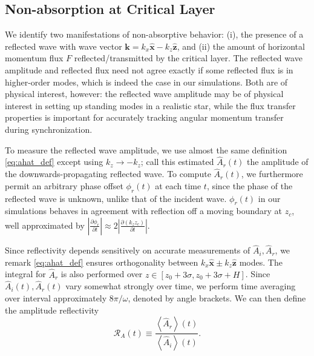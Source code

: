 \documentclass[
        fleqn,
        usenatbib,
    ]{mnras}
\newcommand*{\pd}[2]{\frac{\partial#1}{\partial#2}}
\newcommand*{\abs}[1]{\left|#1\right|}
\newcommand*{\ev}[1]{\left\langle#1\right\rangle}
\newcommand*{\bm}[1]{\boldsymbol{\mathbf{#1}}}
\newcommand*{\uv}[1]{\hat{\boldsymbol{\mathbf{#1}}}}
\begin{document}
\subsection{Non-absorption at Critical Layer}\label{ss:reflectivity}

We identify two manifestations of non-absorptive behavior: (i), the presence of
a reflected wave with wave vector $\bm{k} = k_{x}\uv{x} - k_{z}\uv{z}$, and (ii)
the amount of horizontal momentum flux $F$ reflected/transmitted by the critical
layer. The reflected wave amplitude and reflected flux need not agree exactly if
some reflected flux is in higher-order modes, which is indeed the case in our
simulations. Both are of physical interest, however: the reflected wave
amplitude may be of physical interest in setting up standing modes in a
realistic star, while the flux transfer properties is important for accurately
tracking angular momentum transfer during synchronization.

To measure the reflected wave amplitude, we use almost the same definition
\autoref{eq:ahat_def} except using $k_{z} \to -k_{z}$; call this estimated
$\hat{A}_r(t)$ the amplitude of the downwards-propagating reflected wave. To
compute $\hat{A}_r(t)$, we furthermore permit an arbitrary phase offset
$\phi_r(t)$ at each time $t$, since the phase of the reflected wave is unknown,
unlike that of the incident wave. $\phi_r(t)$ in our simulations
behaves in agreement with reflection off a moving boundary at $z_c$,
well approximated by $\abs{\pd{\phi_r}{t}} \approx 2\abs{\pd{(k_{z}z_c)}{t}}$.

Since reflectivity depends sensitively on accurate measurements of $\hat{A}_i,
\hat{A}_r$, we remark \autoref{eq:ahat_def} ensures orthogonality between
$k_{x}\uv{x} \pm k_{z}\uv{z}$ modes. The integral for $\hat{A}_r$ is also
performed over $z \in [z_0 + 3\sigma, z_0 + 3\sigma + H]$. Since
$\hat{A}_i(t), \hat{A}_r(t)$ vary somewhat strongly over time, we perform time
averaging over interval approximately $8\pi/\omega$, denoted by angle brackets.
We can then define the amplitude reflectivity
\begin{equation}
    \mathcal{R}_A(t) \equiv \frac{\ev{\hat{A}_r}(t)}{\ev{\hat{A}_i}(t)}
        .\label{eq:Ra_def}
\end{equation}
\end{document}

